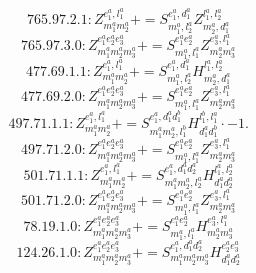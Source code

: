 \documentclass[letterpaper,10pt,fleqn,leqno,onecolumn]{article}
\begin{document}
\begin{equation} \;\;\;\;\;\;  765.97.2.1: Z^{e_{1}^{a},l_{1}^{a}}_{m_{1}^{a}m_{2}^{a}}+=S^{e_{1}^{a},d_{1}^{a}}_{m_{1}^{a},l_{2}^{a}}Z^{l_{1}^{a},l_{2}^{a}}_{m_{2}^{a},d_{1}^{a}} \end{equation}
\begin{equation} \;\;\;\;\;\;  765.97.3.0: Z^{e_{1}^{a}e_{2}^{a}e_{3}^{a}}_{m_{1}^{a}m_{2}^{a}m_{3}^{a}}+=S^{e_{1}^{a}e_{2}^{a}}_{m_{1}^{a},l_{1}^{a}}Z^{e_{3}^{a},l_{1}^{a}}_{m_{2}^{a}m_{3}^{a}} \end{equation}
\begin{equation} \;\;\;\;\;\;  477.69.1.1: Z^{e_{1}^{a},l_{1}^{a}}_{m_{1}^{a}m_{2}^{a}}+=S^{e_{1}^{a},d_{1}^{a}}_{m_{1}^{a},l_{2}^{a}}H^{l_{1}^{a},l_{2}^{a}}_{m_{2}^{a},d_{1}^{a}} \end{equation}
\begin{equation} \;\;\;\;\;\;  477.69.2.0: Z^{e_{1}^{a}e_{2}^{a}e_{3}^{a}}_{m_{1}^{a}m_{2}^{a}m_{3}^{a}}+=S^{e_{1}^{a}e_{2}^{a}}_{m_{1}^{a},l_{1}^{a}}Z^{e_{3}^{a},l_{1}^{a}}_{m_{2}^{a}m_{3}^{a}} \end{equation}
\begin{equation} \;\;\;\;\;\;  497.71.1.1: Z^{e_{1}^{a},l_{1}^{a}}_{m_{1}^{a}m_{2}^{a}}+=S^{e_{1}^{a},d_{1}^{a}d_{1}^{b}}_{m_{1}^{a}m_{2}^{a},l_{1}^{b}}H^{l_{1}^{b},l_{1}^{a}}_{d_{1}^{a}d_{1}^{b}}\cdot -1. \end{equation}
\begin{equation} \;\;\;\;\;\;  497.71.2.0: Z^{e_{1}^{a}e_{2}^{a}e_{3}^{a}}_{m_{1}^{a}m_{2}^{a}m_{3}^{a}}+=S^{e_{1}^{a}e_{2}^{a}}_{m_{1}^{a},l_{1}^{a}}Z^{e_{3}^{a},l_{1}^{a}}_{m_{2}^{a}m_{3}^{a}} \end{equation}
\begin{equation} \;\;\;\;\;\;  501.71.1.1: Z^{e_{1}^{a},l_{1}^{a}}_{m_{1}^{a}m_{2}^{a}}+=S^{e_{1}^{a},d_{1}^{a}d_{2}^{a}}_{m_{1}^{a}m_{2}^{a},l_{2}^{a}}H^{l_{1}^{a},l_{2}^{a}}_{d_{1}^{a}d_{2}^{a}} \end{equation}
\begin{equation} \;\;\;\;\;\;  501.71.2.0: Z^{e_{1}^{a}e_{2}^{a}e_{3}^{a}}_{m_{1}^{a}m_{2}^{a}m_{3}^{a}}+=S^{e_{1}^{a}e_{2}^{a}}_{m_{1}^{a},l_{1}^{a}}Z^{e_{3}^{a},l_{1}^{a}}_{m_{2}^{a}m_{3}^{a}} \end{equation}
\begin{equation} \;\;\;\;\;\;  78.19.1.0: Z^{e_{1}^{a}e_{2}^{a}e_{3}^{a}}_{m_{1}^{a}m_{2}^{a}m_{3}^{a}}+=S^{e_{1}^{a}e_{2}^{a}}_{m_{1}^{a},l_{1}^{a}}H^{e_{3}^{a},l_{1}^{a}}_{m_{2}^{a}m_{3}^{a}} \end{equation}
\begin{equation} \;\;\;\;\;\;  124.26.1.0: Z^{e_{1}^{a}e_{2}^{a}e_{3}^{a}}_{m_{1}^{a}m_{2}^{a}m_{3}^{a}}+=S^{e_{1}^{a},d_{1}^{a}d_{2}^{a}}_{m_{1}^{a}m_{2}^{a}m_{3}^{a}}H^{e_{2}^{a}e_{3}^{a}}_{d_{1}^{a}d_{2}^{a}} \end{equation}
\end{document}
